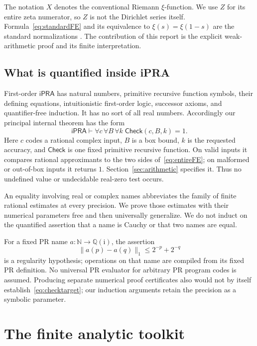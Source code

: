 \documentclass[11pt,letterpaper]{article}
\numberwithin{equation}{section}
\theoremstyle{definition}
\newcommand{\ipra}{\mathsf{iPRA}}
\newcommand{\Q}{\mathbb Q}
\newcommand{\N}{\mathbb N}
\newcommand{\ii}{\mathrm i}
\newcommand{\normone}[1]{\lVert #1\rVert_1}
\begin{document}
The notation \(X\) denotes the conventional Riemann \(\xi\)-function.
We use \(Z\) for its entire zeta numerator, so \(Z\) is not the Dirichlet
series itself. Formula~\eqref{eq:standardFE} and its equivalence to
\(\xi(s)=\xi(1-s)\) are the standard normalizations
\cite{DLMF25}. The contribution of this report is the explicit weak-arithmetic
proof and its finite interpretation.

\subsection{What is quantified inside iPRA}

First-order \(\ipra\) has natural numbers, primitive recursive function
symbols, their defining equations, intuitionistic first-order logic,
successor axioms, and quantifier-free induction. It has no sort of all
real numbers. Accordingly our principal internal theorem has the form
\begin{equation}
 \ipra\vdash
 \forall c\,\forall B\,\forall k\;
                \mathsf{Check}(c,B,k)=1.                     \label{eq:checktarget}
\end{equation}
Here \(c\) codes a rational complex input, \(B\) is a box bound, \(k\) is
the requested accuracy, and \(\mathsf{Check}\) is one fixed primitive
recursive function. On valid inputs it compares rational approximants
to the two sides of~\eqref{eq:entireFE}; on malformed or out-of-box
inputs it returns \(1\). Section~\ref{sec:arithmetic} specifies it.
Thus no undefined value or undecidable real-zero test occurs.

An equality involving real or complex names abbreviates the family of
finite rational estimates at every precision. We prove those estimates
with their numerical parameters free and then universally generalize.
We do not induct on the quantified assertion that a name is Cauchy or
that two names are equal.

For a fixed PR name \(a:\N\to\Q(\ii)\), the assertion
\[
 \normone{a(p)-a(q)}\le 2^{-p}+2^{-q}
\]
is a regularity hypothesis; operations on that name are compiled from
its fixed PR definition. No universal PR evaluator for arbitrary PR
program codes is assumed. Producing separate numerical proof
certificates also would not by itself establish~\eqref{eq:checktarget};
our induction arguments retain the precision as a symbolic parameter.

\section{The finite analytic toolkit}\label{sec:toolkit}
\end{document}
